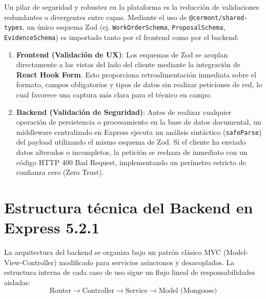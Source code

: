 Un pilar de seguridad y robustez en la plataforma es la reducción de validaciones redundantes o divergentes entre capas. Mediante el uso de \texttt{@cermont/shared-types}, un único esquema Zod (ej. \texttt{WorkOrderSchema}, \texttt{ProposalSchema}, \texttt{EvidenceSchema}) es importado tanto por el frontend como por el backend:
\begin{enumerate}
    \item \textbf{Frontend (Validación de UX)}: Los esquemas de Zod se acoplan directamente a las vistas del lado del cliente mediante la integración de \textbf{React Hook Form}. Esto proporciona retroalimentación inmediata sobre el formato, campos obligatorios y tipos de datos sin realizar peticiones de red, lo cual favorece una captura más clara para el técnico en campo.
    \item \textbf{Backend (Validación de Seguridad)}: Antes de realizar cualquier operación de persistencia o procesamiento en la base de datos documental, un middleware centralizado en Express ejecuta un análisis sintáctico (\texttt{safeParse}) del payload utilizando el mismo esquema de Zod. Si el cliente ha enviado datos alterados o incompletos, la petición se rechaza de inmediato con un código HTTP 400 Bad Request, implementando un perímetro estricto de confianza cero (Zero Trust).
\end{enumerate}

\section{Estructura técnica del Backend en Express 5.2.1}

La arquitectura del backend se organiza bajo un patrón clásico MVC (Model-View-Controller) modificado para servicios asíncronos y desacoplados. La estructura interna de cada caso de uso sigue un flujo lineal de responsabilidades aisladas:
\begin{equation}
\text{Router} \longrightarrow \text{Controller} \longrightarrow \text{Service} \longrightarrow \text{Model (Mongoose)}
\end{equation}


